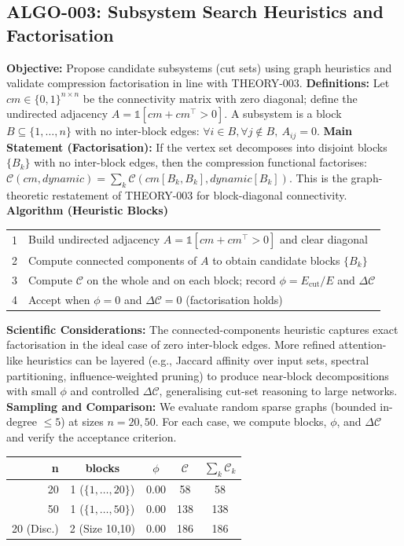\subsection{ALGO-003: Subsystem Search Heuristics and Factorisation}
\textbf{Objective:} Propose candidate subsystems (cut sets) using graph heuristics and validate compression factorisation in line with THEORY-003.
\textbf{Definitions:} Let \(cm\in\{0,1\}^{n\times n}\) be the connectivity matrix with zero diagonal; define the undirected adjacency \(A=\mathbb{1}[cm+cm^\top>0]\). A subsystem is a block \(B\subseteq\{1,\dots,n\}\) with no inter-block edges: \(\forall i\in B,\forall j\notin B,\ A_{ij}=0\).
\textbf{Main Statement (Factorisation):} If the vertex set decomposes into disjoint blocks \(\{B_k\}\) with no inter-block edges, then the compression functional factorises: \(\mathcal{C}(cm, dynamic)=\sum_k \mathcal{C}(cm[B_k,B_k], dynamic[B_k])\). This is the graph-theoretic restatement of THEORY-003 for block-diagonal connectivity.
\textbf{Algorithm (Heuristic Blocks)}
\begin{center}
\begin{tabular}{ll}
\toprule
\midrule
1 & Build undirected adjacency \(A=\mathbb{1}[cm+cm^\top>0]\) and clear diagonal \\
2 & Compute connected components of \(A\) to obtain candidate blocks \(\{B_k\}\) \\
3 & Compute \(\mathcal{C}\) on the whole and on each block; record \(\phi=E_{\mathrm{cut}}/E\) and \(\Delta \mathcal{C}\) \\
4 & Accept when \(\phi=0\) and \(\Delta \mathcal{C}=0\) (factorisation holds) \\
\bottomrule
\end{tabular}
\end{center}
\textbf{Scientific Considerations:} The connected-components heuristic captures exact factorisation in the ideal case of zero inter-block edges. More refined attention-like heuristics can be layered (e.g., Jaccard affinity over input sets, spectral partitioning, influence-weighted pruning) to produce near-block decompositions with small \(\phi\) and controlled \(\Delta \mathcal{C}\), generalising cut-set reasoning to large networks.
\textbf{Sampling and Comparison:} We evaluate random sparse graphs (bounded in-degree \(\le 5\)) at sizes \(n=20,50\). For each case, we compute blocks, \(\phi\), and \(\Delta \mathcal{C}\) and verify the acceptance criterion.
\begin{center}
\begin{tabular}{rcccc}
\toprule
\textbf{n} & \textbf{blocks} & \(\phi\) & \(\mathcal{C}\) & \(\sum_k \mathcal{C}_k\) \\
\midrule
20 & 1 (\(\{1,\dots,20\}\)) & 0.00 & 58 & 58 \\
50 & 1 (\(\{1,\dots,50\}\)) & 0.00 & 138 & 138 \\
20 (Disc.) & 2 (Size 10,10) & 0.00 & 186 & 186 \\
\bottomrule
\end{tabular}
\end{center}
